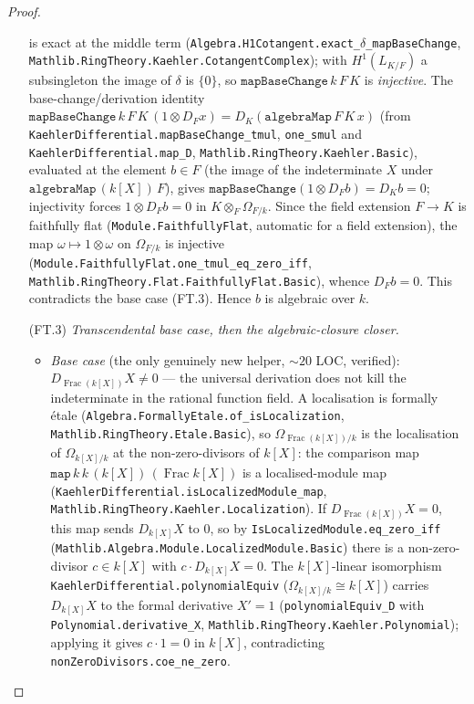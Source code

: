 \begin{proof}
\begin{itemize}
\[    \]
    is exact at the middle term (\texttt{Algebra.H1Cotangent.exact\_\(\delta\)\_mapBaseChange}, \texttt{Mathlib.RingTheory.Kaehler.CotangentComplex}); with \(H^1(L_{K/F})\) a subsingleton the image of \(\delta\) is \(\{0\}\), so \(\mathtt{mapBaseChange}\,k\,F\,K\) is \emph{injective}. The base-change/derivation identity \(\mathtt{mapBaseChange}\,k\,F\,K\,(1 \otimes D_F x) = D_K(\mathtt{algebraMap}\,F\,K\,x)\) (from \texttt{KaehlerDifferential.mapBaseChange\_tmul}, \texttt{one\_smul} and \texttt{KaehlerDifferential.map\_D}, \texttt{Mathlib.RingTheory.Kaehler.Basic}), evaluated at the element \(b \in F\) (the image of the indeterminate \(X\) under \(\mathtt{algebraMap}\,(k[X])\,F\)), gives \(\mathtt{mapBaseChange}(1 \otimes D_F b) = D_K b = 0\); injectivity forces \(1 \otimes D_F b = 0\) in \(K \otimes_F \Omega_{F/k}\). Since the field extension \(F \to K\) is faithfully flat (\texttt{Module.FaithfullyFlat}, automatic for a field extension), the map \(\omega \mapsto 1 \otimes \omega\) on \(\Omega_{F/k}\) is injective (\texttt{Module.FaithfullyFlat.one\_tmul\_eq\_zero\_iff}, \texttt{Mathlib.RingTheory.Flat.FaithfullyFlat.Basic}), whence \(D_F b = 0\). This contradicts the base case (FT.3). Hence \(b\) is algebraic over \(k\).
    \item[(FT.3)] \emph{Transcendental base case, then the algebraic-closure closer.}
    \begin{itemize}
      \item \emph{Base case} (the only genuinely new helper, \({\sim}20\) LOC, verified): \(D_{\operatorname{Frac}(k[X])} X \neq 0\) --- the universal derivation does not kill the indeterminate in the rational function field. A localisation is formally \'etale (\texttt{Algebra.FormallyEtale.of\_isLocalization}, \texttt{Mathlib.RingTheory.Etale.Basic}), so \(\Omega_{\operatorname{Frac}(k[X])/k}\) is the localisation of \(\Omega_{k[X]/k}\) at the non-zero-divisors of \(k[X]\): the comparison map \(\mathtt{map}\,k\,k\,(k[X])\,(\operatorname{Frac} k[X])\) is a localised-module map (\texttt{KaehlerDifferential.isLocalizedModule\_map}, \texttt{Mathlib.RingTheory.Kaehler.Localization}). If \(D_{\operatorname{Frac}(k[X])} X = 0\), this map sends \(D_{k[X]} X\) to \(0\), so by \texttt{IsLocalizedModule.eq\_zero\_iff} (\texttt{Mathlib.Algebra.Module.LocalizedModule.Basic}) there is a non-zero-divisor \(c \in k[X]\) with \(c \cdot D_{k[X]} X = 0\). The \(k[X]\)-linear isomorphism \texttt{KaehlerDifferential.polynomialEquiv} (\(\Omega_{k[X]/k} \cong k[X]\)) carries \(D_{k[X]} X\) to the formal derivative \(X' = 1\) (\texttt{polynomialEquiv\_D} with \texttt{Polynomial.derivative\_X}, \texttt{Mathlib.RingTheory.Kaehler.Polynomial}); applying it gives \(c \cdot 1 = 0\) in \(k[X]\), contradicting \texttt{nonZeroDivisors.coe\_ne\_zero}.

\end{itemize}
\end{itemize}
\end{proof}
